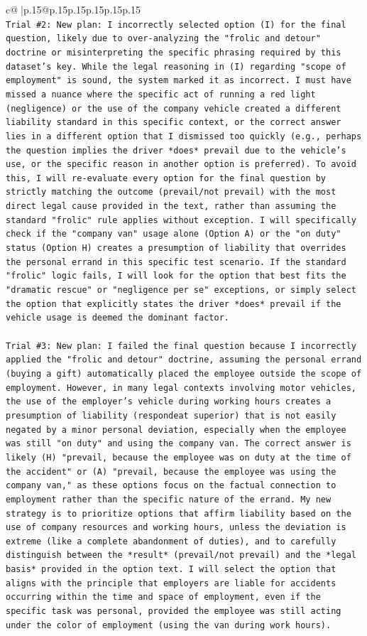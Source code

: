 \documentclass{article}
\begin{document}
{\begin{supertabular}{c@{$\;$}|p{.15\linewidth}@{}p{.15\linewidth}p{.15\linewidth}p{.15\linewidth}p{.15\linewidth}p{.15\linewidth}}
{{{\\ 
\texttt{Trial \#2: New plan: I incorrectly selected option (I) for the final question, likely due to over{-}analyzing the "frolic and detour" doctrine or misinterpreting the specific phrasing required by this dataset's key. While the legal reasoning in (I) regarding "scope of employment" is sound, the system marked it as incorrect. I must have missed a nuance where the specific act of running a red light (negligence) or the use of the company vehicle created a different liability standard in this specific context, or the correct answer lies in a different option that I dismissed too quickly (e.g., perhaps the question implies the driver *does* prevail due to the vehicle's use, or the specific reason in another option is preferred). To avoid this, I will re{-}evaluate every option for the final question by strictly matching the outcome (prevail/not prevail) with the most direct legal cause provided in the text, rather than assuming the standard "frolic" rule applies without exception. I will specifically check if the "company van" usage alone (Option A) or the "on duty" status (Option H) creates a presumption of liability that overrides the personal errand in this specific test scenario. If the standard "frolic" logic fails, I will look for the option that best fits the "dramatic rescue" or "negligence per se" exceptions, or simply select the option that explicitly states the driver *does* prevail if the vehicle usage is deemed the dominant factor.} \\
\\ 
\texttt{Trial \#3: New plan: I failed the final question because I incorrectly applied the "frolic and detour" doctrine, assuming the personal errand (buying a gift) automatically placed the employee outside the scope of employment. However, in many legal contexts involving motor vehicles, the use of the employer's vehicle during working hours creates a presumption of liability (respondeat superior) that is not easily negated by a minor personal deviation, especially when the employee was still "on duty" and using the company van. The correct answer is likely (H) "prevail, because the employee was on duty at the time of the accident" or (A) "prevail, because the employee was using the company van," as these options focus on the factual connection to employment rather than the specific nature of the errand. My new strategy is to prioritize options that affirm liability based on the use of company resources and working hours, unless the deviation is extreme (like a complete abandonment of duties), and to carefully distinguish between the *result* (prevail/not prevail) and the *legal basis* provided in the option text. I will select the option that aligns with the principle that employers are liable for accidents occurring within the time and space of employment, even if the specific task was personal, provided the employee was still acting under the color of employment (using the van during work hours).} \\
}}}
\end{supertabular}}
\end{document}

